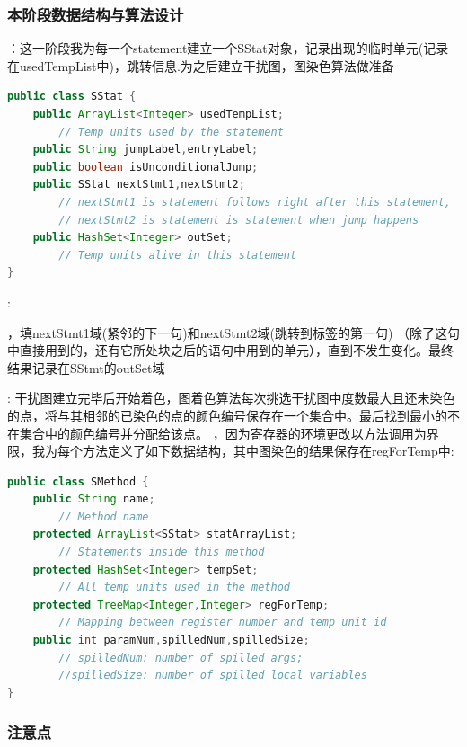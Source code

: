 \documentclass[11pt, oneside]{article}   	%
\begin{document}
\begin{spacing}{1.55}
    \subsubsection{本阶段数据结构与算法设计}
    \begin{enumerate}
    ：这一阶段我为每一个statement建立一个SStat对象，记录出现的临时单元(记录在usedTempList中)，跳转信息.为之后建立干扰图，图染色算法做准备
    \begin{lstlisting}[language=Java]
public class SStat {
    public ArrayList<Integer> usedTempList;  
        // Temp units used by the statement
    public String jumpLabel,entryLabel;
    public boolean isUnconditionalJump;
    public SStat nextStmt1,nextStmt2;
        // nextStmt1 is statement follows right after this statement,
        // nextStmt2 is statement is statement when jump happens
    public HashSet<Integer> outSet; 
        // Temp units alive in this statement
}
    \end{lstlisting}
    :
    \begin{enumerate}
    ，填nextStmt1域(紧邻的下一句)和nextStmt2域(跳转到标签的第一句)
    （除了这句中直接用到的，还有它所处块之后的语句中用到的单元），直到不发生变化。最终结果记录在SStmt的outSet域
    \end{enumerate}
    :
    干扰图建立完毕后开始着色，图着色算法每次挑选干扰图中度数最大且还未染色的点，将与其相邻的已染色的点的颜色编号保存在一个集合中。最后找到最小的不在集合中的颜色编号并分配给该点。
    ，因为寄存器的环境更改以方法调用为界限，我为每个方法定义了如下数据结构，其中图染色的结果保存在regForTemp中:
    \begin{lstlisting}[language=Java]
public class SMethod {
    public String name;
        // Method name
    protected ArrayList<SStat> statArrayList;
        // Statements inside this method
    protected HashSet<Integer> tempSet;
        // All temp units used in the method
    protected TreeMap<Integer,Integer> regForTemp;
        // Mapping between register number and temp unit id
    public int paramNum,spilledNum,spilledSize;
        // spilledNum: number of spilled args; 
        //spilledSize: number of spilled local variables
}
    \end{lstlisting}
    \end{enumerate}
    \subsubsection{注意点}

\end{spacing}
\end{document}
